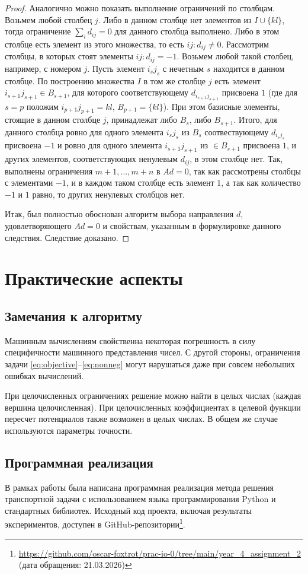 \documentclass[12pt]{article}
\theoremstyle{definition}
\theoremstyle{plain}
\theoremstyle{definition}
\begin{document}
\begin{proof}
Аналогично можно показать выполнение ограничений по столбцам.
Возьмем любой столбец $j$. Либо в данном столбце нет
элементов из $I \cup \{kl\}$,
тогда ограничение $\sum_{i} d_{ij} = 0$ для данного столбца выполнено.
Либо в этом
столбце есть элемент из этого множества, то есть $ij: d_{ij} \neq 0$. 
Рассмотрим столбцы, в которых стоят элементы $ij: d_{ij} = -1$. Возьмем
любой такой столбец, например, с номером $j$. Пусть элемент
$i_sj_s$ с нечетным $s$ находится в данном столбце. По построению множества $I$
в том же столбце $j$ есть элемент $i_{s+1}j_{s+1} \in B_{s+1}$, для которого
соответствующему $d_{i_{s+1}j_{s+1}}$ присвоена $1$ (где для $s=p$ положим
$i_{p+1}j_{p+1} = kl$, $B_{p+1} = \{kl\}$). При этом базисные элементы,
стоящие в данном столбце $j$, принадлежат либо $B_s$, либо $B_{s+1}$. Итого, для
данного столбца ровно для одного элемента $i_sj_s$ из $B_s$ соотвествующему
$d_{i_sj_s}$ присвоена $-1$ и ровно для одного элемента $i_{s+1}j_{s+1}$
из $\in B_{s+1}$ присвоена $1$, и других элементов, соответствующих ненулевым
$d_{ij}$, в этом столбце нет. Так, выполнены ограничения
$m+1,\dots,m+n$ в $Ad=0$, так как рассмотрены столбцы с элементами $-1$, и в
каждом таком столбце есть элемент $1$, а так как количество $-1$ и $1$ равно, то
других ненулевых столбцов нет.

Итак, был полностью обоснован алгоритм выбора направления $d$, удовлетворяющего
$Ad = 0$ и свойствам, указанным в формулировке данного следствия.
Следствие доказано.
\end{proof}

\section{Практические аспекты}
\subsection{Замечания к алгоритму}

Машинным вычислениям свойственна некоторая погрешность в силу
специфичности машинного представления чисел. С другой стороны,
ограничения задачи \eqref{eq:objective}--\eqref{eq:nonneg}
могут нарушаться даже при совсем небольших ошибках вычислений.

При целочисленных ограничениях решение можно найти в целых числах (каждая
вершина целочисленная). При целочисленных коэффициентах в целевой функции
пересчет потенциалов также возможен в целых числах.
В общем же случае используются параметры точности.

\subsection{Программная реализация}
В рамках работы была написана
программная реализация метода решения транспортной задачи с
использованием языка программирования Python и стандартных библиотек.
Исходный код проекта, включая результаты экспериментов,
доступен в GitHub-репозитории\footnote{\url{https://github.com/oscar-foxtrot/prac-io-0/tree/main/year_4_assignment_2} (дата обращения: 21.03.2026)}.
\end{document}
